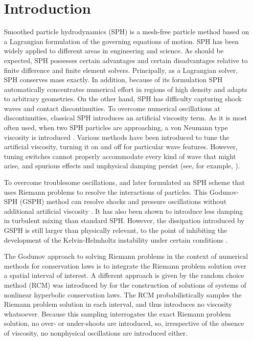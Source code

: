 \documentclass[preprint,12pt,authoryear]{elsarticle}
\begin{document}
\section{Introduction}
Smoothed particle hydrodynamics (SPH) \citep{gingold1977smoothed,lucy1977numerical} is a mesh-free particle method based on a Lagrangian formulation of the governing equations of motion.
SPH has been widely applied to different areas in engineering and science. As should be expected, SPH possesses certain advantages and certain disadvantages relative to finite difference and finite element solvers. Principally, as a Lagrangian solver, SPH conserves mass exactly. 
In addition, because of its formulation SPH automatically concentrates numerical effort in regions of high density and adapts to arbitrary geometries. On the other hand, 
SPH has difficulty capturing shock waves and contact discontinuities. To overcome numerical oscillations at discontinuities, classical SPH introduces an artificial viscosity term. As it is most often used, when two SPH particles are approaching, a von Neumann type viscosity is introduced
\citep{monaghan1983shock, monaghan1997sph,klapp2012strong}. 
Various methods have been introduced to tune the artificial viscosity, turning it on and off for particular wave features. However, tuning switches cannot properly accommodate every kind of wave that might arise, and spurious effects and unphysical damping persist (see, for example, \cite{borgani2012hydrodynamic,flebbe1994smoothed,morris1997switch, dolag2005turbulent,cullen2010inviscid,sigalotti2008adaptive,puri2014comparison}).
 
To overcome troublesome oscillations, \citet{inutsuka2002reformulation} and later \citet{cha2003implementations} formulated an SPH scheme that uses Riemann problems to resolve the interactions of particles. This Godunov-SPH (GSPH) method can resolve shocks and pressure oscillations without additional artificial viscosity \citep{inutsuka2002reformulation, cha2003implementations,iwasaki2011smoothed, puri2014approximate,borgani2012hydrodynamic}. It has also been shown to introduce less damping in turbulent mixing \citep{cha2010kelvin, borgani2012hydrodynamic} than standard SPH. 
However, the dissipation introduced by GSPH is still larger than physically relevant, to the point
of inhibiting the development of the Kelvin-Helmholtz instability under certain conditions \citep{borgani2012hydrodynamic}.

The Godunov approach to solving Riemann problems in the context of numerical methods for conservation laws is to integrate the Riemann problem solution over a spatial interval of interest. A different approach is given by the random choice method (RCM) was introduced by \citet{glimm1965solutions} for the construction of solutions of systems of nonlinear hyperbolic conservation laws. The RCM probabilistically samples the Riemann problem solution in each interval, and thus introduces no viscosity whatsoever. Because this sampling interrogates the exact Riemann problem solution, no over- or under-shoots are introduced, so, irrespective of the absence of viscosity, no nonphysical oscillations are introduced either.
\end{document}
